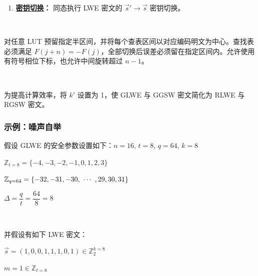 \begin{tcolorbox}[title={\textbf{\tboxlabel{\ref*{subsec:tfhe-summary}} TFHE 噪声自举流程}}]
\begin{enumerate}
$ $

\item \textbf{\underline{密钥切换}：} 同态执行 LWE 密文的 $\vec{s}' \rightarrow \vec{s}$ 密钥切换。





\end{enumerate}

$ $

对任意 LUT 预留指定半区间，并将每个查表区间以对应编码明文为中心。查找表必须满足 $F(j+n)=-F(j)$，全部切换后误差必须留在指定区间内。允许使用有符号相位下标，也允许中间旋转超过 $n-1$。

$ $

 为提高计算效率，将 $k'$ 设置为 1，使 GLWE 与 GGSW 密文简化为 RLWE 与 RGSW 密文。
\end{tcolorbox}


\subsubsection{示例：噪声自举}
\label{subsec:tfhe-noise-bootstrapping-ex}

假设 GLWE 的安全参数设置如下：$n = 16$, $t = 8$, $q = 64$, $k = 8$

$\mathbb{Z}_{t=8} = \{-4, -3, -2, -1, 0 , 1, 2, 3\}$

$\mathbb{Z}_{q=64} = \{ -32, -31, -30, \text{ } \text{$\cdots$} \text{ }, 29, 30, 31 \}$

$\Delta = \dfrac{q}{t} = \dfrac{64}{8} = 8$

$ $

并假设有如下 LWE 密文：

$\vec{s} = (1, 0, 0, 1, 1, 1, 0, 1) \in \mathbb{Z}_2^{k=8}$

$m = 1  \in \mathbb{Z}_{t=8}$

